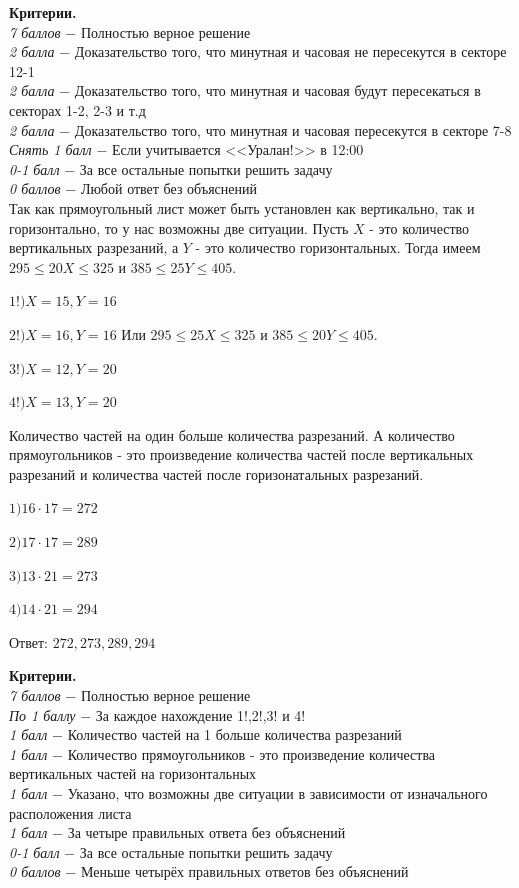 \centerline{\bf }
\centerline{\bf }
\centerline{\bf }
\centerline{\bf }

\textbf{Критерии.} \\
\textit{7 баллов} $-$ Полностью верное решение\\
\textit{2 балла} $-$ Доказательство того, что минутная и часовая не пересекутся в секторе 12-1\\
\textit{2 балла} $-$ Доказательство того, что минутная и часовая будут пересекаться в секторах 1-2, 2-3 и т.д\\
\textit{2 балла} $-$ Доказательство того, что минутная и часовая пересекутся в секторе 7-8\\
\textit{Снять 1 балл} $-$ Если учитывается <<Уралан!>> в 12:00\\ 
\textit{0-1 балл} $-$ За все остальные попытки решить задачу\\
\textit{0 баллов} $-$ Любой ответ без объяснений\\

 Так как прямоугольный лист может быть установлен как вертикально, так и горизонтально, то у нас возможны две ситуации. Пусть $X$ - это количество вертикальных разрезаний, а $Y$ - это количество горизонтальных. Тогда имеем $295	\leqslant 20X 	\leqslant 325$ и $385	\leqslant 25Y 	\leqslant 405$. 

$1!) X=15, Y=16$

$2!) X=16, Y=16$ Или $295	\leqslant 25X 	\leqslant 325$ и $385	\leqslant 20Y 	\leqslant 405$.

$3!) X=12, Y=20$

$4!) X=13, Y=20$

Количество частей на один больше количества разрезаний. А количество прямоугольников - это произведение количества частей после вертикальных разрезаний и количества частей после горизонатальных разрезаний.

$1) 16\cdot17=272$

$2) 17\cdot17=289$

$3) 13\cdot21=273$

$4) 14\cdot21=294$

Ответ: $272, 273, 289, 294$

\textbf{Критерии.} \\
\textit{7 баллов} $-$ Полностью верное решение\\
\textit{По 1 баллу} $-$ За каждое нахождение 1!,2!,3! и 4! \\ 
\textit{1 балл} $-$ Количество частей на 1 больше количества разрезаний\\
\textit{1 балл} $-$ Количество прямоугольников - это произведение количества вертикальных частей на горизонтальных\\
\textit{1 балл} $-$ Указано, что возможны две ситуации в зависимости от изначального расположения листа\\
\textit{1 балл} $-$  За четыре правильных ответа без объяснений\\ 
\textit{0-1 балл} $-$ За все остальные попытки решить задачу\\
\textit{0 баллов} $-$ Меньше четырёх правильных ответов без объяснений\\
\par

